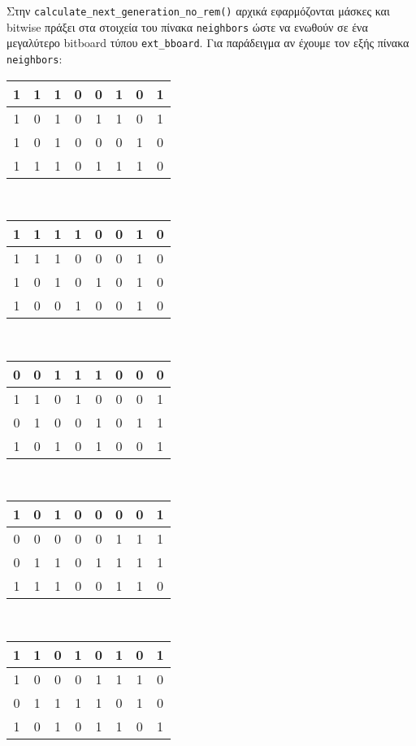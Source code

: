 Στην \lstinline!calculate_next_generation_no_rem()! αρχικά εφαρμόζονται μάσκες και bitwise
πράξει στα στοιχεία του πίνακα \lstinline!neighbors! ώστε να ενωθούν σε ένα μεγαλύτερο bitboard τύπου \lstinline!ext_bboard!. 
Για παράδειγμα αν έχουμε τον εξής πίνακα \lstinline!neighbors!:\\
\begin{tabular}{ | c | c | c | c | c | c | c | c |}
\hline
1 & 1 & 1 & 0 & 0 & 1 & 0 & 1 \\ \hline
1 & 0 & 1 & 0 & 1 & 1 & 0 & 1 \\ \hline
1 & 0 & 1 & 0 & 0 & 0 & 1 & 0 \\ \hline
1 & 1 & 1 & 0 & 1 & 1 & 1 & \cellcolor{blue!25}0 \\ \hline
\end{tabular} \
\begin{tabular}{ | c | c | c | c | c | c | c | c |}
\hline
1 & 1 & 1 & 1 & 0 & 0 & 1 & 0 \\ \hline
1 & 1 & 1 & 0 & 0 & 0 & 1 & 0 \\ \hline
1 & 0 & 1 & 0 & 1 & 0 & 1 & 0 \\ \hline
\cellcolor{blue!25}1 & \cellcolor{blue!25}0 & \cellcolor{blue!25}0 & \cellcolor{blue!25}1 & \cellcolor{blue!25}0 & \cellcolor{blue!25}0 & \cellcolor{blue!25}1 & \cellcolor{blue!25}0 \\ \hline
\end{tabular} \
\begin{tabular}{ | c | c | c | c | c | c | c | c |}
\hline
0 & 0 & 1 & 1 & 1 & 0 & 0 & 0 \\ \hline
1 & 1 & 0 & 1 & 0 & 0 & 0 & 1 \\ \hline
0 & 1 & 0 & 0 & 1 & 0 & 1 & 1 \\ \hline
\cellcolor{blue!25}1 & 0 & 1 & 0 & 1 & 0 & 0 & 1 \\ \hline
\end{tabular} \\
\begin{tabular}{ | c | c | c | c | c | c | c | c |}
\hline
1 & 0 & 1 & 0 & 0 & 0 & 0 & \cellcolor{blue!25}1 \\ \hline
0 & 0 & 0 & 0 & 0 & 1 & 1 & \cellcolor{blue!25}1 \\ \hline
0 & 1 & 1 & 0 & 1 & 1 & 1 & \cellcolor{blue!25}1 \\ \hline
1 & 1 & 1 & 0 & 0 & 1 & 1 & \cellcolor{blue!25}0 \\ \hline
\end{tabular} \
\begin{tabular}{ | c | c | c | c | c | c | c | c |}
\hline
1 & 1 & 0 & 1 & 0 & 1 & 0 & 1 \\ \hline
1 & 0 & 0 & 0 & 1 & 1 & 1 & 0 \\ \hline
0 & 1 & 1 & 1 & 1 & 0 & 1 & 0 \\ \hline
1 & 0 & 1 & 0 & 1 & 1 & 0 & 1 \\ \hline
\end{tabular} \
